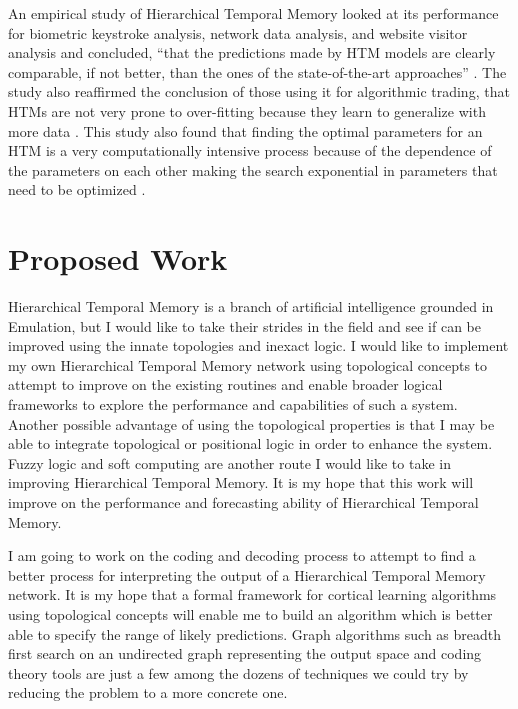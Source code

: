 \documentclass[fleqn,notitlepage,minimal]{article}
\begin{document}
	An empirical study of Hierarchical Temporal Memory looked at its performance for biometric keystroke analysis, network data analysis, and website visitor analysis and concluded, ``that the predictions made by HTM models are clearly comparable, if not better, than the ones of the state-of-the-art approaches'' \cite{Galetzka}. The study also reaffirmed the conclusion of those using it for algorithmic trading, that HTMs are not very prone to over-fitting because they learn to generalize with more data \cite{Evaluation} \cite{Galetzka}. This study also found that finding the optimal parameters for an HTM is a very computationally intensive process because of the dependence of the parameters on each other making the search exponential in parameters that need to be optimized \cite{Galetzka}.
	
	\section{Proposed Work}
	
	Hierarchical Temporal Memory is a branch of artificial intelligence grounded in Emulation, but I would like to take their strides in the field and see if can be improved using the innate topologies and inexact logic. I would like to implement my own Hierarchical Temporal Memory network using topological concepts to attempt to improve on the existing routines and enable broader logical frameworks to explore the performance and capabilities of such a system. Another possible advantage of using the topological properties is that I may be able to integrate topological or positional logic in order to enhance the system. Fuzzy logic and soft computing are another route I would like to take in improving Hierarchical Temporal Memory. It is my hope that this work will improve on the performance and forecasting ability of Hierarchical Temporal Memory.
	
	I am going to work on the coding and decoding process to attempt to find a better process for interpreting the output of a Hierarchical Temporal Memory network. It is my hope that a formal framework for cortical learning algorithms using topological concepts will enable me to build an algorithm which is better able to specify the range of likely predictions. Graph algorithms such as breadth first search on an undirected graph representing the output space and coding theory tools are just a few among the dozens of techniques we could try by reducing the problem to a more concrete one.
	
\end{document}
